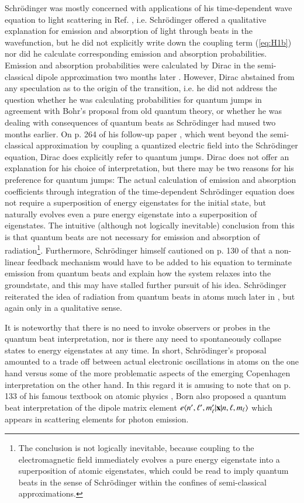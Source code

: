 \documentclass[final,3p,times,twocolumn]{elsarticle3}
\begin{document}
Schr\"odinger was mostly concerned with applications of his time-dependent wave 
equation to light scattering in Ref. \cite{erwin}, i.e. Schr\"odinger offered a 
qualitative explanation for emission and absorption of light through beats in the 
wavefunction, but he did not explicitly write down the coupling term (\ref{eq:H1b})
nor did he calculate corresponding emission and absorption probabilities.
Emission and absorption probabilities were calculated by Dirac in the semi-classical 
dipole approximation two months later \cite{dirac1a}. However, Dirac abstained from 
any speculation as to the origin of the transition, i.e. he did not address the
question whether he was calculating 
probabilities for quantum jumps in agreement with Bohr's proposal from old quantum 
theory, or whether he was dealing with consequences of quantum beats as Schr\"odinger 
had mused two months earlier. On p. 264 of his follow-up paper \cite{dirac1b}, which 
went beyond the semi-classical approximation by coupling a quantized electric field 
into the Schr\"odinger equation, Dirac does explicitly refer to quantum jumps. 
Dirac does not offer an explanation for his choice of interpretation, but there may 
be two reasons for his preference for quantum jumps: The actual calculation of 
emission and absorption coefficients through integration of the time-dependent 
Schr\"odinger equation does not require a superposition of energy eigenstates for 
the initial state, but naturally evolves even a pure energy eigenstate into a 
superposition of eigenstates. The intuitive (although not logically inevitable) 
conclusion from this is that quantum beats are not necessary for emission and 
absorption of radiation\footnote{The conclusion is not logically inevitable, because 
coupling to the electromagnetic field immediately evolves a pure energy eigenstate 
into a superposition of atomic eigenstates, which could be read to imply quantum 
beats in the sense of Schr\"odinger within the confines of semi-classical 
approximations.}. Furthermore, Schr\"odinger himself cautioned on p. 130 
of \cite{erwin} that a non-linear feedback mechanism would have to be added to his 
equation to terminate emission from quantum beats and explain how the system relaxes 
into the groundstate, and this may have stalled further pursuit of his idea. 
Schr\"odinger reiterated the idea of radiation from quantum beats in atoms much later 
in \cite{erwin2,erwin3}, but again only in a qualitative sense.

It is noteworthy that there is no need to invoke observers or probes in the quantum 
beat interpretation, nor is there any need to spontaneously collapse states to energy 
eigenstates at any time. In short, Schr\"odinger's proposal amounted to a trade off 
between actual electronic oscillations in atoms on the one hand versus some of the 
more problematic aspects of the emerging Copenhagen interpretation on the other hand. 
In this regard it is amusing to note that on p. 133 of his famous textbook on atomic 
physics \cite{born}, Born also proposed a quantum beat interpretation of the dipole 
matrix element $e\langle n',\ell',m'_\ell|\mathrm{\bf x}|n,\ell,m_\ell\rangle$ which appears
in scattering elements for photon emission.
\end{document}
